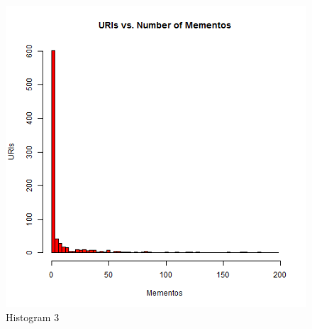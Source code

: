 \newpage
\begin{figure}[ht]    
    \begin{center}
        \includegraphics[scale=0.60]{q2-histogram3.png}
        \caption{Histogram 3}
        \label{Histogram 3}
    \end{center}
\end{figure}
\newpage